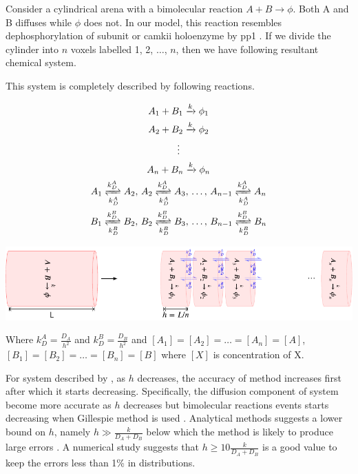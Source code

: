 \documentclass[9pt,lineno,doublespacing]{elife}
\begin{document}
{\begin{appendixbox}
Consider a cylindrical arena with a bimolecular reaction $A+B \rightarrow \phi$.
Both A and B diffuses while $\phi$ does not. In our model, this reaction
resembles dephosphorylation of subunit or \gls{camkii} holoenzyme by \gls{pp1} .
If we divide the cylinder into $n$ voxels labelled 1, 2, $\ldots$, $n$, then we
have following resultant chemical system.

This system is completely described by following reactions.

\begin{equation}
    \begin{gathered}
        A_1 + B_1 \xrightarrow{k} \phi_1 \\
        A_2 + B_2 \xrightarrow{k} \phi_2 \\
        \vdots \\
        A_n + B_n \xrightarrow{k} \phi_n \\
        A_1 \xrightleftharpoons[k_D^A]{k_D^A} A_2 ,\, A_2 \xrightleftharpoons[k_D^A]{k_D^A} A_3 
            ,\, \ldots,\, A_{n-1} \xrightleftharpoons[k_D^A]{k_D^A} A_n \\ 
        B_1 \xrightleftharpoons[k_D^B]{k_D^B} B_2 ,\, 
            B_2 \xrightleftharpoons[k_D^B]{k_D^B} B_3 ,\, 
            \ldots,\, B_{n-1} \xrightleftharpoons[k_D^B]{k_D^B} B_n \\ 
    \end{gathered}
    \label{eq:discrete}
\end{equation}

\begin{center}
\includegraphics[width=0.8\linewidth]{./PaperFigures/suppl/figure_diff.pdf}
\end{center}

Where $k_D^A=\frac{D_A}{h^2}$ and $k_D^B=\frac{D_B}{h^2}$ and
$[A_1]=[A_2]=\ldots=[A_n]=[A]$, $[B_1]=[B_2]=\ldots=[B_n]=[B]$ where $[X]$ is
concentration of X.

For system described by , as $h$ decreases, the accuracy of
method increases first after which it starts decreasing. Specifically, the
diffusion component of system become more accurate as $h$ decreases but
bimolecular reactions events starts decreasing when Gillespie method is used
\citep{gardiner_correlations_1976}. Analytical methods  suggests a lower bound on
$h$, namely $h\gg \frac{k}{D_A+D_B}$ below which the method is likely to
produce large errors \citep{isaacson_reaction-diffusion_2009}. A numerical
study \citep{erban_stochastic_2009} suggests that $h\ge 10\frac{k}{D_A+D_B}$ is
a good value to keep the errors less than 1\% in distributions.


\end{appendixbox}}
\end{document}
